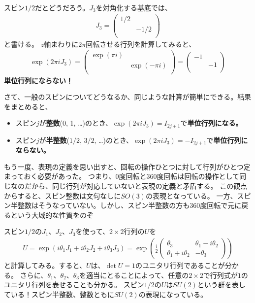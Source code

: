 \documentclass[10pt,a4paper]{jarticle}
\begin{document}
スピン$1/2$だとどうだろう。$J_3$を対角化する基底では、
\begin{align}
J_3 = \left(\begin{array}{ccc}
1/2 & \\
& -1/2  \\
\end{array}\right)
\end{align}
と書ける。
$z$軸まわりに$2\pi$回転させる行列を計算してみると、
\begin{align}
\exp\left( 2\pi i J_3 \right)
= \left(\begin{array}{ccc}
\exp(\pi i) & \\
& \exp(-\pi i) \\
\end{array}\right)
= \left(\begin{array}{ccc}
-1 & \\
& -1 \\
\end{array}\right)
\end{align}
\textbf{単位行列にならない！}

さて、一般のスピンについてどうなるか、同じような計算が簡単にできる。結果をまとめると、
\begin{itemize}
\item スピン$j$が\textbf{整数}(0, 1, \dots)のとき、$\exp(2\pi i J_3) = I_{2j+1}$で\textbf{単位行列になる。}
\item スピン$j$が\textbf{半整数}($1/2$, $3/2$, \dots)のとき、$\exp(2\pi i J_3) = -I_{2j+1}$で\textbf{単位行列にならない。}
\end{itemize}
もう一度、表現の定義を思い出すと、回転の操作ひとつに対して行列がひとつ定まっておく必要があった。
つまり、0度回転と360度回転は回転の操作として同じなのだから、同じ行列が対応していないと表現の定義と矛盾する。
この観点からすると、スピン整数は文句なしに$SO(3)$の表現となっている。
一方、スピン半整数はそうなっていない。しかし、スピン半整数の方も360度回転で元に戻るという大域的な性質をのぞ

スピン$1/2$の$J_1$、$J_2$、$J_3$を使って、$2\times 2$行列の$U$を
\begin{align}
U =
\exp\left( i\theta_1 J_1 + i\theta_2 J_2 + i\theta_3 J_3  \right)
=
\exp\left( \frac{i}{2}\left(\begin{array}{cc}
\theta_3 & \theta_1 - i \theta_2 \\
\theta_1 + i \theta_2 & -\theta_3
\end{array}\right)\right)
\end{align}
と計算してみる。すると、$U$は、$\det U = 1$のユニタリ行列であることが分かる。
さらに、$\theta_1$、$\theta_2$、$\theta_3$を適当にとることによって、任意の$2\times 2$で行列式が$1$のユニタリ行列を表せることも分かる。
スピン$1/2$の$U$は$SU(2)$という群を表している！スピン半整数、整数ともに$SU(2)$の表現になっている。
\end{document}
